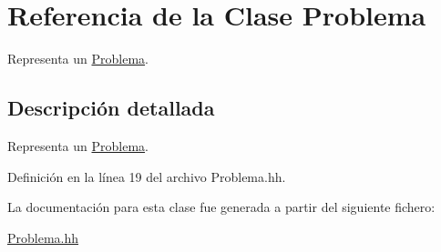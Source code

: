 \hypertarget{class_problema}{}\section{Referencia de la Clase Problema}
\label{class_problema}


Representa un \mbox{\hyperlink{class_problema}{Problema}}.  




\subsection{Descripción detallada}
Representa un \mbox{\hyperlink{class_problema}{Problema}}. 

Definición en la línea 19 del archivo Problema.\+hh.



La documentación para esta clase fue generada a partir del siguiente fichero\+:\begin{DoxyCompactItemize}
\item 
\mbox{\hyperlink{_problema_8hh}{Problema.\+hh}}\end{DoxyCompactItemize}
